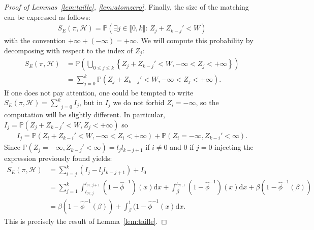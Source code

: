 \documentclass[11pt]{article}
\begin{document}
\begin{proof}[Proof of Lemmas~\ref{lem:taille}, \ref{lem:atomzero}]
\bigskip
    
    Finally, the size of the matching can be expressed as follows:
    \begin{align*}
    S_E(\pi,{\mathcal{H}})=\mathbb{P}(\exists  j\in\llbracket 0, k\rrbracket: \, Z_j+Z_{k-j}' < W )  
    \end{align*}
    with the convention $+\infty + (-\infty)=+\infty$.
    We will compute this probability by decomposing with respect to the index of $Z_j$:
    \begin{align*}
        S_E(\pi,{\mathcal{H}})&=\mathbb{P}\left( \bigcup_{0 \leq j \leq k} \left\{ Z_j+Z_{k-j}'<W , -\infty < Z_j < +\infty   \right\}  \right) \\
        &=\sum_{j=0}^{k} \mathbb{P}\left( Z_j+Z_{k-j}'<W, -\infty < Z_j < +\infty  \right).
    \end{align*}
    If one does not pay attention, one could be tempted to write $S_E(\pi,{\mathcal{H}})=\underset{j=0}{\overset{k}{\sum}} I_j$, but in $I_j$ we do not forbid $Z_i=-\infty$, so the computation will be slightly different.
    In particular, $I_j=\mathbb{P}(Z_j+Z_{k-j}'<W, Z_j<+\infty)$ so 
    \begin{align*}
        I_j=\mathbb{P}\left( Z_i+Z_{k-i}'<W, -\infty < Z_i < +\infty  \right) +\mathbb{P}(Z_i=-\infty, Z_{k-i}' < \infty).
    \end{align*}
    Since $\mathbb{P}(Z_j=-\infty,Z_{k-j}'<\infty)=l_j l_{k-j+1}$ if $i\neq 0$ and $0$ if $j=0$ injecting the expression previously found yields:
    \begin{align*}
        S_E(\pi,{\mathcal{H}})&=\sum_{i=j}^{k}(I_j-l_j l_{k-j+1}) + I_0 \\
        &= \sum_{j=1}^{k}\int_{l_{\mathcal{H},j}}^{l_{\mathcal{H},j+1}}(1-\hat{\phi}^{-1})(x)\mathrm{d}x +  \int_{\beta}^{l_{\mathcal{H},1}}(1-\hat{\phi}^{-1})(x)\mathrm{d}x + \beta(1-\hat{\phi}^{-1}(\beta)) \\
        &=\beta(1-\hat{\phi}^{-1}(\beta)) + \int_{\beta}^{1}(1-\hat{\phi}^{-1}(x)\mathrm{d}x .
    \end{align*}
    This is precisely the result of Lemma~\ref{lem:taille}.
\end{proof}
\end{document}
